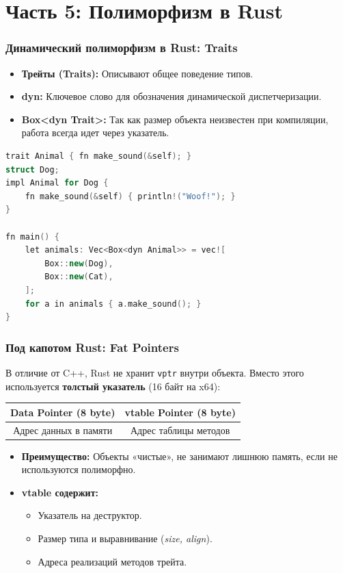 \documentclass[10pt, aspectratio=169]{beamer}
\begin{document}
\section{Часть 5: Полиморфизм в Rust}


\begin{frame}[fragile]
\frametitle{Динамический полиморфизм в Rust: Traits}
\begin{itemize}
    \item \textbf{Трейты (Traits):} Описывают общее поведение типов.
    \item \textbf{dyn:} Ключевое слово для обозначения динамической диспетчеризации.
    \item \textbf{Box<dyn Trait>:} Так как размер объекта неизвестен при компиляции, работа всегда идет через указатель.
\end{itemize}

\begin{lstlisting}[language=C++, basicstyle=\tiny, keywordstyle=\color{blue}]
trait Animal { fn make_sound(&self); }
struct Dog;
impl Animal for Dog {
    fn make_sound(&self) { println!("Woof!"); }
}

fn main() {
    let animals: Vec<Box<dyn Animal>> = vec![
        Box::new(Dog),
        Box::new(Cat),
    ];
    for a in animals { a.make_sound(); }
}
\end{lstlisting}
\end{frame}


\begin{frame}
\frametitle{Под капотом Rust: Fat Pointers}
В отличие от C++, Rust не хранит \texttt{vptr} внутри объекта. Вместо этого используется \textbf{толстый указатель} (16 байт на x64):

\vspace{0.5cm}
\begin{center}
\begin{tabular}{|c|c|}
\hline
\textbf{Data Pointer (8 byte)} & \textbf{vtable Pointer (8 byte)} \\ \hline
Адрес данных в памяти & Адрес таблицы методов \\ \hline
\end{tabular}
\end{center}
\vspace{0.5cm}

\begin{itemize}
    \item \textbf{Преимущество:} Объекты «чистые», не занимают лишнюю память, если не используются полиморфно.
    \item \textbf{vtable содержит:}
    \begin{itemize}
        \item Указатель на деструктор.
        \item Размер типа и выравнивание (\textit{size, align}).
        \item Адреса реализаций методов трейта.
    \end{itemize}
\end{itemize}
\end{frame}
\end{document}
